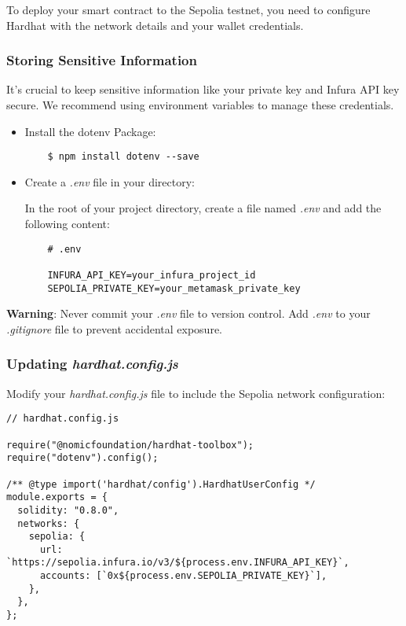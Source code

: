 \documentclass[12pt]{article}
\begin{document}
To deploy your smart contract to the Sepolia testnet, you need to configure Hardhat with the network details and your wallet credentials.

\subsubsection{Storing Sensitive Information}

It's crucial to keep sensitive information like your private key and Infura API key secure. We recommend using environment variables to manage these credentials.

\begin{itemize}

\item Install the dotenv Package:
    
    \begin{verbatim}
    $ npm install dotenv --save
    \end{verbatim}
    
\item Create a \textit{.env} file in your directory:

    In the root of your project directory, create a file named \textit{.env} and add the following content:

    \begin{verbatim}
    # .env
    
    INFURA_API_KEY=your_infura_project_id
    SEPOLIA_PRIVATE_KEY=your_metamask_private_key
    \end{verbatim}
\end{itemize}
\textbf{Warning}: Never commit your \textit{.env} file to version control. Add \textit{.env} to your \textit{.gitignore} file to prevent accidental exposure.

\subsubsection{Updating \textit{hardhat.config.js}}

Modify your \textit{hardhat.config.js} file to include the Sepolia network configuration:

\begin{verbatim}
// hardhat.config.js

require("@nomicfoundation/hardhat-toolbox");
require("dotenv").config();

/** @type import('hardhat/config').HardhatUserConfig */
module.exports = {
  solidity: "0.8.0",
  networks: {
    sepolia: {
      url: `https://sepolia.infura.io/v3/${process.env.INFURA_API_KEY}`,
      accounts: [`0x${process.env.SEPOLIA_PRIVATE_KEY}`],
    },
  },
};
\end{verbatim}
\end{document}
